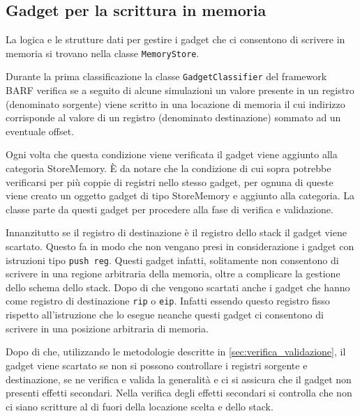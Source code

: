 \subsection{Gadget per la scrittura in memoria}
\label{sec:memorystore}

La logica e le strutture dati per gestire i gadget che ci consentono
di scrivere in memoria si trovano nella classe
\lstinline{MemoryStore}. 

Durante la prima classificazione la classe
\lstinline{GadgetClassifier} del framework BARF verifica se a seguito
di alcune simulazioni un valore presente in un registro (denominato
sorgente) viene scritto in una locazione di memoria il cui indirizzo
corrisponde al valore di un registro (denominato destinazione) sommato
ad un eventuale offset.

Ogni volta che questa condizione viene verificata il gadget viene
aggiunto alla categoria StoreMemory. È da notare che la condizione di
cui sopra potrebbe verificarsi per più coppie di registri nello stesso
gadget, per ognuna di queste viene creato un oggetto gadget di tipo
StoreMemory e aggiunto alla categoria. La classe parte da questi
gadget per procedere alla fase di verifica e validazione.

Innanzitutto se il registro di destinazione è il registro dello stack
il gadget viene scartato. Questo fa in modo che non vengano presi in
considerazione i gadget con istruzioni tipo \lstinline{push reg}.
Questi gadget infatti, solitamente non consentono di scrivere in una
regione arbitraria della memoria, oltre a complicare la gestione dello
schema dello stack. Dopo di che vengono scartati anche i gadget che
hanno come registro di destinazione \lstinline{rip} o
\lstinline{eip}. Infatti essendo questo registro fisso rispetto
all'istruzione che lo esegue neanche questi gadget ci consentono di
scrivere in una posizione arbitraria di memoria.

Dopo di che, utilizzando le metodologie descritte in
\ref{sec:verifica_validazione}, il gadget viene scartato se non si
possono controllare i registri sorgente e destinazione, se ne verifica
e valida la generalità e ci si assicura che il gadget non presenti
effetti secondari. Nella verifica degli effetti secondari si controlla
che non ci siano scritture al di fuori della locazione scelta e dello
stack.

